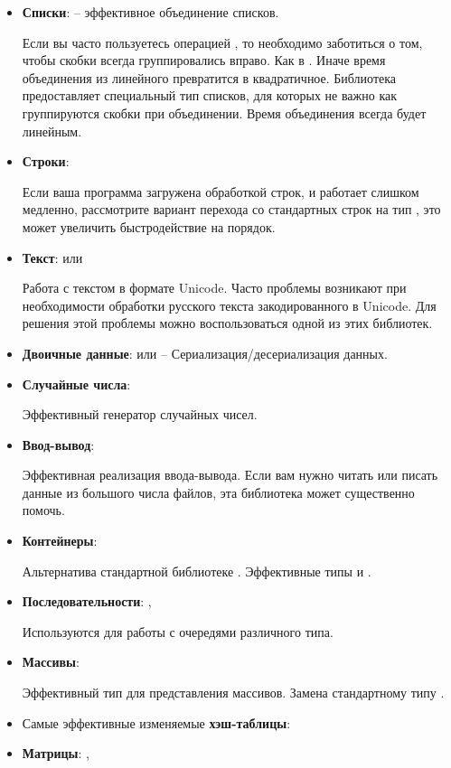 
\begin{itemize}
\item
  \textbf{Списки}:  -- эффективное объединение списков.

  Если вы часто пользуетесь операцией \In{++}, то необходимо заботиться
  о том, чтобы скобки всегда группировались вправо. Как в
  . Иначе время объединения из линейного превратится
  в квадратичное. Библиотека  предоставляет специальный тип
  списков, для которых не важно как группируются скобки при объединении.
  Время объединения всегда будет линейным.
\item
  \textbf{Строки}: 

  Если ваша программа загружена обработкой строк, и работает слишком
  медленно, рассмотрите вариант перехода со стандартных строк на тип
  , это может увеличить быстродействие на порядок.
\item
  \textbf{Текст}:  или 

  Работа с текстом в формате Unicode. Часто проблемы возникают при
  необходимости обработки русского текста закодированного в Unicode. Для
  решения этой проблемы можно воспользоваться одной из этих библиотек.
\item
  \textbf{Двоичные данные}:  или  --
  Сериализация/десериализация данных.
\item
  \textbf{Случайные числа}: 

  Эффективный генератор случайных чисел.
\item
  \textbf{Ввод-вывод}: 

  Эффективная реализация ввода-вывода. Если вам нужно читать или писать
  данные из большого числа файлов, эта библиотека может существенно
  помочь.
\item
  \textbf{Контейнеры}: 

  Альтернатива стандартной библиотеке . Эффективные типы
   и .
\item
  \textbf{Последовательности}: , 

  Используются для работы с очередями различного типа.
\item
  \textbf{Массивы}: 

  Эффективный тип для представления массивов. Замена стандартному типу
  .
\item
  Самые эффективные изменяемые \textbf{хэш-таблицы}: 
\item
  \textbf{Матрицы}: , 
\end{itemize}

